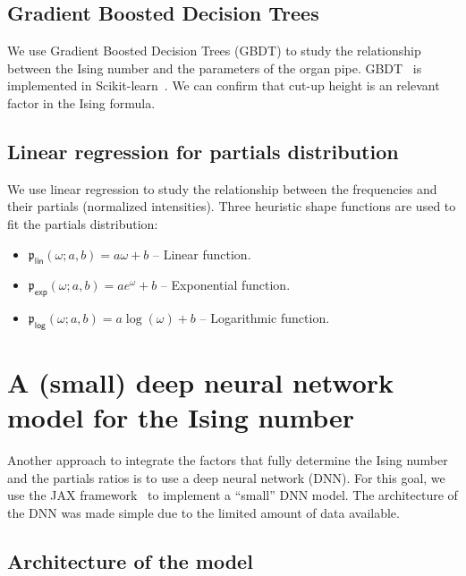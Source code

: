 \documentclass{psu-report}
\begin{document}
\section{Gradient Boosted Decision Trees}

We use Gradient Boosted Decision Trees (GBDT) to study the relationship
between the Ising number and the parameters of the organ pipe.
GBDT~\autocite{2001Fri-1} is implemented in Scikit-learn~\autocite{2016Kra-1}.
We can confirm that cut-up height is an relevant factor in the Ising formula.

\section{Linear regression for partials distribution}

We use linear regression to study the relationship between the frequencies and
their partials (normalized intensities).
Three heuristic shape functions are used to fit the partials distribution:
\begin{itemize}
    \item \(\mathfrak{p}_\mathsf{lin}(\omega; a, b) = a \omega + b\) -- Linear function.
    \item \(\mathfrak{p}_\mathsf{exp}(\omega; a, b) = a e^{\omega} + b\) -- Exponential function.
    \item \(\mathfrak{p}_\mathsf{log}(\omega; a, b) = a \log(\omega) + b\) -- Logarithmic function.
\end{itemize}



\chapter[DNN model for Ising number]{A (small) deep neural network model for the Ising number}

Another approach to integrate the factors that fully determine the Ising number
and the partials ratios is to use a deep neural network (DNN).
For this goal, we use the JAX framework~\autocite{2018Jax-1, 2020Optax-1,
2024Flax-1} to implement a ``small'' DNN model.
The architecture of the DNN was made simple due to the limited amount of data
available.

\section{Architecture of the model}
\end{document}

